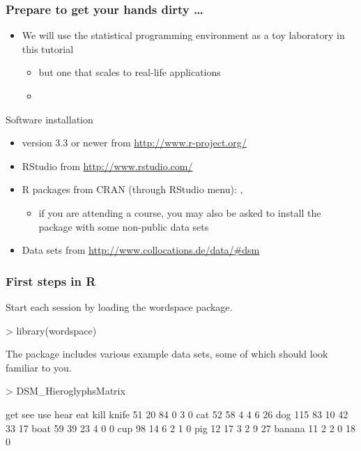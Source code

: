 \documentclass[t]{beamer} %
\begin{document}
\begin{frame}
  \frametitle{Prepare to get your hands dirty \ldots}
  
  \begin{itemize}
  \item We will use the statistical programming environment \href{http://www.r-project.org/}{} as a toy laboratory in this tutorial
    \begin{itemize}
    \item[\hand] but one that scales to real-life applications
    \item[]
    \end{itemize}
  \end{itemize}

  Software installation
  \begin{itemize}
  \item {} version 3.3 or newer from \url{http://www.r-project.org/}
  \item RStudio from \url{http://www.rstudio.com/}
  \item R packages from CRAN (through RStudio menu):
    , 
    \begin{itemize}
    \item if you are attending a course, you may also be asked to install the  package with some non-public data sets
    \end{itemize}
  \item Data sets from \url{http://www.collocations.de/data/\#dsm}
  \end{itemize}
\end{frame}

\begin{frame}[fragile]
  \frametitle{First steps in R}

Start each session by loading the wordspace package.
\begin{Rcode}
> library(wordspace)
\end{Rcode}


The package includes various example data sets, some of which should look familiar to you.
\begin{Rcode}
> DSM_HieroglyphsMatrix\begin{Rout}
       get see use hear eat kill
knife   51  20  84    0   3    0
cat     52  58   4    4   6   26
dog    115  83  10   42  33   17
boat    59  39  23    4   0    0
cup     98  14   6    2   1    0
pig     12  17   3    2   9   27
banana  11   2   2    0  18    0
\end{Rout}
\end{Rcode}

\end{frame}
\end{document}
